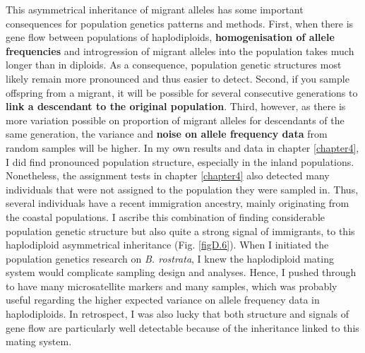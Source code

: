 \documentclass[10pt, twoside]{book} %
\begin{document}
	This asymmetrical inheritance of migrant alleles has some important consequences for population genetics patterns and methods. First, when there is gene flow between populations of haplodiploids, \textbf{homogenisation of allele frequencies} and introgression of migrant alleles into the population takes much longer than in diploids. As a consequence, population genetic structures most likely remain more pronounced and thus easier to detect. Second, if you sample offspring from a migrant, it will be possible for several consecutive generations to \textbf{link a descendant to the original population}. Third, however, as there is more variation possible on proportion of migrant alleles for descendants of the same generation, the variance and \textbf{noise on allele frequency data} from random samples will be higher. In my own results and data in chapter \ref{chapter4}, I did find pronounced population structure, especially in the inland populations. Nonetheless, the assignment tests in chapter \ref{chapter4} also detected many individuals that were not assigned to the population they were sampled in. Thus, several individuals have a recent immigration ancestry, mainly originating from the coastal populations. I ascribe this combination of finding considerable population genetic structure but also quite a strong signal of immigrants, to this haplodiploid asymmetrical inheritance (Fig. \ref{figD.6}). When I initiated the population genetics research on \textit{B. rostrata}, I knew the haplodiploid mating system would complicate sampling design and analyses. Hence, I pushed through to have many microsatellite markers and many samples, which was probably useful regarding the higher expected variance on allele frequency data in haplodiploids. In retrospect, I was also lucky that both structure and signals of gene flow are particularly well detectable because of the inheritance linked to this mating system.\\
	
\end{document}

